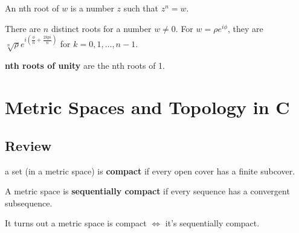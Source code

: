 \documentclass[a4paper, 12pt]{article}
\newcommand{\bt}[1]{\textbf{#1}} %
\begin{document}
\begin{multicols}{2}
An nth root of $w$ is a number $z$ such that $z^n = w$.

There are $n$ distinct roots for a number $w \neq 0$.
For $w = \rho e^{i\phi}$, they are $\sqrt[n]{\rho}e^{i(\frac{\phi}{n} + 
\frac{2kpi}{n})}$
for $k = 0, 1, \dots, n-1$.

\bt{nth roots of unity} are the nth roots of 1.

\section{Metric Spaces and Topology in C}

\subsection{Review}
a set (in a metric space) is \bt{compact} if every open cover has a finite
subcover.

A metric space is \bt{sequentially compact} if every sequence has a convergent 
subsequence.

It turns out a metric space is compact $\iff$ it's sequentially compact.

\end{multicols}
\end{document}
